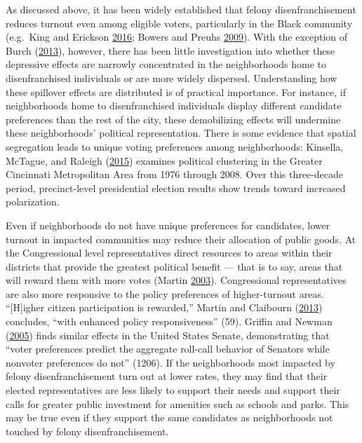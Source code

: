 \documentclass[12pt,]{article}
\begin{document}
As discussed above, it has been widely established that felony disenfranchisement reduces turnout even among eligible voters, particularly in the Black community (e.g.~King and Erickson \protect\hyperlink{ref-King2016}{2016}; Bowers and Preuhs \protect\hyperlink{ref-Bowers2009}{2009}). With the exception of Burch (\protect\hyperlink{ref-Burch2013}{2013}), however, there has been little investigation into whether these depressive effects are narrowly concentrated in the neighborhoods home to disenfranchised individuals or are more widely dispersed. Understanding how these spillover effects are distributed is of practical importance. For instance, if neighborhoods home to disenfranchised individuals display different candidate preferences than the rest of the city, these demobilizing effects will undermine these neighborhoods' political representation. There is some evidence that spatial segregation leads to unique voting preferences among neighborhoods: Kinsella, McTague, and Raleigh (\protect\hyperlink{ref-Kinsella2015}{2015}) examines political clustering in the Greater Cincinnati Metropolitan Area from 1976 through 2008. Over this three-decade period, precinct-level presidential election results show trends toward increased polarization.

Even if neighborhoods do not have unique preferences for candidates, lower turnout in impacted communities may reduce their allocation of public goods. At the Congressional level representatives direct resources to areas within their districts that provide the greatest political benefit --- that is to say, areas that will reward them with more votes (Martin \protect\hyperlink{ref-Martin2003}{2003}). Congressional representatives are also more responsive to the policy preferences of higher-turnout areas. ``{[}H{]}igher citizen participation is rewarded,'' Martin and Claibourn (\protect\hyperlink{ref-Martin2013}{2013}) concludes, ``with enhanced policy responsiveness'' (59). Griffin and Newman (\protect\hyperlink{ref-Griffin2005}{2005}) finds similar effects in the United States Senate, demonstrating that ``voter preferences predict the aggregate roll-call behavior of Senators while nonvoter preferences do not'' (1206). If the neighborhoods most impacted by felony disenfranchisement turn out at lower rates, they may find that their elected representatives are less likely to support their needs and support their calls for greater public investment for amenities such as schools and parks. This may be true even if they support the same candidates as neighborhoods not touched by felony disenfranchisement.
\end{document}

